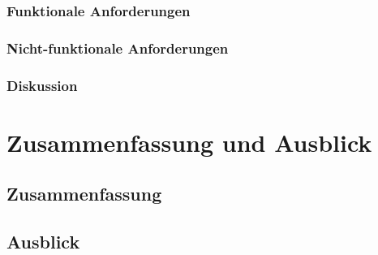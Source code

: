 \documentclass[a4paper, fontsize=12pt]{scrartcl}
\begin{document}
\subsubsection{Funktionale Anforderungen}\label{subsubsec:functional-requirements}
\subsubsection{Nicht-funktionale Anforderungen}\label{subsubsec:non-functional-requirements}
\subsubsection{Diskussion}\label{subsubsec:anforderungsanalyse-discussion}

\section{Zusammenfassung und Ausblick}\label{sec:summary}
\subsection{Zusammenfassung}\label{subsec:summary}
\subsection{Ausblick}\label{subsec:outlook}

\newpage

\printbibliography{}
\listoffigures
\end{document}
